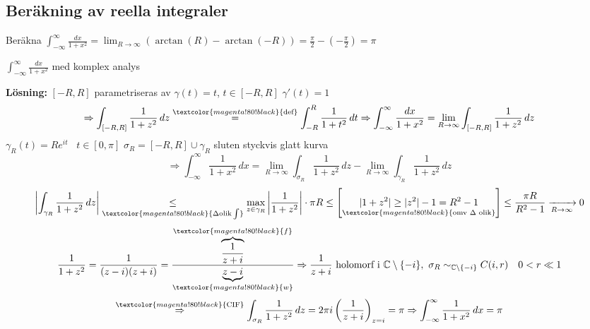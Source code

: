 \subsection{Beräkning av reella integraler}
\begin{example}
Beräkna $\displaystyle\int_{-\infty}^{\infty} \frac{dx}{1 + x^2} = \lim_{R \to \infty} (\arctan(R) - \arctan(-R)) = \frac{\pi}{2} - \left(-\frac{\pi}{2}\right) = \pi$

$\displaystyle\int_{-\infty}^{\infty} \frac{dx}{1 + x^2}$ med komplex analys

\textbf{Lösning:}
$[-R, R]$ parametriseras av $\gamma(t) = t$, $t \in [-R, R]$ \quad $\gamma'(t) = 1$
\[ \Rightarrow \int_{[-R, R]} \frac{1}{1 + z^2}\,dz \overset{\textcolor{magenta!80!black}{\text{def}}}{=} \int_{-R}^{R} \frac{1}{1 + t^2}\,dt \Rightarrow \int_{-\infty}^{\infty} \frac{dx}{1 + x^2} = \lim_{R \to \infty} \int_{[-R, R]} \frac{1}{1 + z^2}\,dz \]
$\gamma_R(t) = Re^{it}$ \ $t \in [0, \pi]$ \quad $\sigma_R = [-R, R] \cup \gamma_R$ sluten styckvis glatt kurva
\[ \Rightarrow \int_{-\infty}^{\infty} \frac{1}{1 + x^2}\,dx = \lim_{R \to \infty} \int_{\sigma_R} \frac{1}{1 + z^2}\,dz - \lim_{R \to \infty} \int_{\gamma_R} \frac{1}{1 + z^2}\,dz \]
\[ \left| \int_{\gamma_R} \frac{1}{1 + z^2}\,dz \right| \underset{\textcolor{magenta!80!black}{\Delta\text{olik} \int}}{\le} \max_{z \in \gamma_R} \left| \frac{1}{1 + z^2} \right| \cdot \pi R \le \left[ \underset{\textcolor{magenta!80!black}{\text{omv } \Delta \text{ olik}}}{|1 + z^2| \ge |z^2| - 1 = R^2 - 1} \right] \le \frac{\pi R}{R^2 - 1} \xrightarrow[R \to \infty]{} 0 \]
\[ \frac{1}{1 + z^2} = \frac{1}{(z - i)(z + i)} = \frac{\overbrace{\frac{1}{z + i}}^{\textcolor{magenta!80!black}{f}}}{\underbrace{z - i}_{\textcolor{magenta!80!black}{w}}} \Rightarrow \frac{1}{z + i} \text{ holomorf i } \mathbb{C} \setminus \{-i\}, \ \sigma_R \sim_{\mathbb{C} \setminus \{-i\}} C(i, r) \quad 0 < r \ll 1 \]
\[ \overset{\textcolor{magenta!80!black}{\text{CIF}}}{\Rightarrow} \int_{\sigma_R} \frac{1}{1 + z^2}\,dz = 2\pi i \left( \frac{1}{z + i} \right)_{z = i} = \pi \Rightarrow \int_{-\infty}^{\infty} \frac{1}{1 + x^2}\,dx = \pi \]
\end{example}

